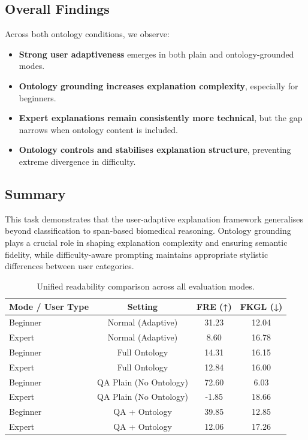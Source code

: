 \subsection{Overall Findings}

Across both ontology conditions, we observe:

\begin{itemize}
    \item \textbf{Strong user adaptiveness} emerges in both plain and ontology-grounded modes.
    \item \textbf{Ontology grounding increases explanation complexity}, especially for beginners.
    \item \textbf{Expert explanations remain consistently more technical}, but the gap narrows when ontology content is included.
    \item \textbf{Ontology controls and stabilises explanation structure}, preventing extreme divergence in difficulty.
\end{itemize}

\subsection*{Summary}

This task demonstrates that the user-adaptive explanation framework generalises beyond classification to span-based biomedical reasoning. Ontology grounding plays a crucial role in shaping explanation complexity and ensuring semantic fidelity, while difficulty-aware prompting maintains appropriate stylistic differences between user categories.

\begin{table}[h]
\centering
\small
\begin{tabular}{lccc}
\toprule
\textbf{Mode / User Type} & \textbf{Setting} & \textbf{FRE (↑)} & \textbf{FKGL (↓)} \\
\midrule
Beginner & Normal (Adaptive) & 31.23 & 12.04 \\
Expert   & Normal (Adaptive) & 8.60  & 16.78 \\
\midrule
Beginner & Full Ontology     & 14.31 & 16.15 \\
Expert   & Full Ontology     & 12.84 & 16.00 \\
\midrule
Beginner & QA Plain (No Ontology) & 72.60 & 6.03 \\
Expert   & QA Plain (No Ontology) & -1.85 & 18.66 \\
\midrule
Beginner & QA + Ontology     & 39.85 & 12.85 \\
Expert   & QA + Ontology     & 12.06 & 17.26 \\
\bottomrule
\end{tabular}
\caption{Unified readability comparison across all evaluation modes.}
\label{tab:unified_readability}
\end{table}




